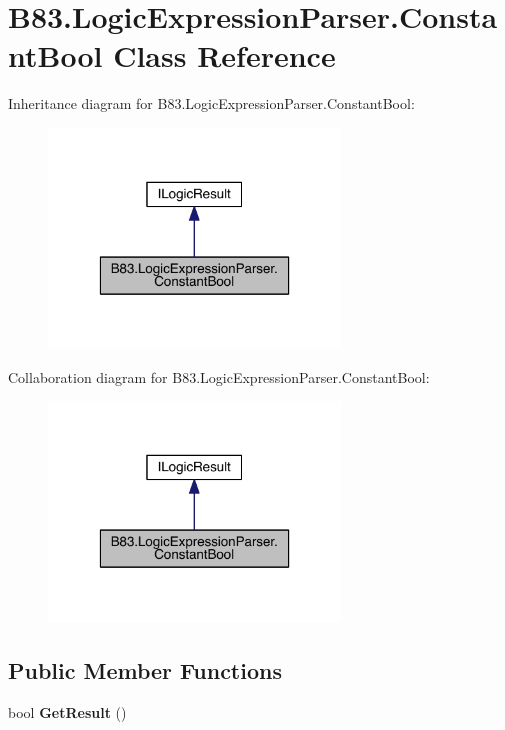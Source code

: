 \hypertarget{class_b83_1_1_logic_expression_parser_1_1_constant_bool}{}\section{B83.\+Logic\+Expression\+Parser.\+Constant\+Bool Class Reference}
\label{class_b83_1_1_logic_expression_parser_1_1_constant_bool}


Inheritance diagram for B83.\+Logic\+Expression\+Parser.\+Constant\+Bool\+:\nopagebreak
\begin{figure}[H]
\begin{center}
\leavevmode
\includegraphics[width=220pt]{class_b83_1_1_logic_expression_parser_1_1_constant_bool__inherit__graph}
\end{center}
\end{figure}


Collaboration diagram for B83.\+Logic\+Expression\+Parser.\+Constant\+Bool\+:\nopagebreak
\begin{figure}[H]
\begin{center}
\leavevmode
\includegraphics[width=220pt]{class_b83_1_1_logic_expression_parser_1_1_constant_bool__coll__graph}
\end{center}
\end{figure}
\subsection*{Public Member Functions}
\begin{DoxyCompactItemize}
\item 
bool {\bfseries Get\+Result} ()\hypertarget{class_b83_1_1_logic_expression_parser_1_1_constant_bool_a8eaa6a2f3a9ee1f02e0ac156517ec69c}{}\label{class_b83_1_1_logic_expression_parser_1_1_constant_bool_a8eaa6a2f3a9ee1f02e0ac156517ec69c}

\end{DoxyCompactItemize}
